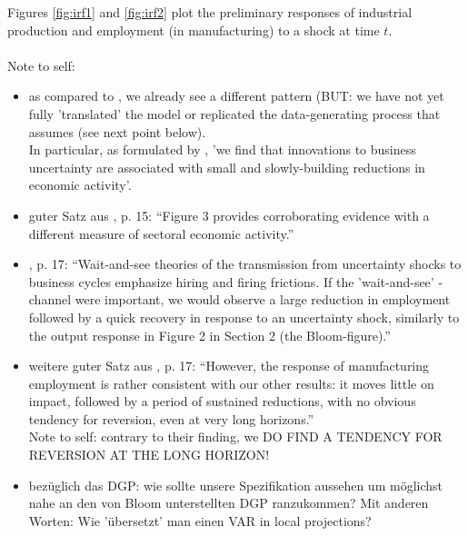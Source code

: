 \documentclass[a4paper,12pt,oneside,pointednumbers,bibtotoc,bigheadings,liststotoc]{scrbook}
\begin{document}
Figures \ref{fig:irf1} and \ref{fig:irf2} plot the preliminary responses of industrial production and employment (in manufacturing) to a shock at time $t$. \\
\\
Note to self:
\begin{itemize}
	\item as compared to \citet{bloom:09}, we already see a different pattern (BUT: we have not yet fully 'translated' the model or replicated the data-generating process that \citet{bloom:09} assumes (see next point below).\\
	In particular, as formulated by \citet{bachmannetal:13}, 'we find that innovations to business uncertainty are associated with small and slowly-building reductions in economic activity'. 
	\item guter Satz aus \citet{bachmannetal:13}, p. 15: ``Figure 3 provides corroborating evidence with a different measure of sectoral economic activity.'' 
	\item \citet{bachmannetal:13}, p. 17: ``Wait-and-see theories of the transmission from uncertainty shocks to business cycles emphasize hiring and firing frictions. If the 'wait-and-see' - channel were important, we would observe a large reduction in employment followed by a quick recovery in response to an uncertainty shock, similarly to the output response in Figure 2 in Section 2 (the Bloom-figure).''
	\item weitere guter Satz aus \citet{bachmannetal:13}, p. 17: ``However, the response of manufacturing employment is rather consistent with our other results: it moves little on impact, followed by a period of sustained reductions, with no obvious tendency for reversion, even at very long horizons.'' \\
	Note to self: contrary to their finding, we DO FIND A TENDENCY FOR REVERSION AT THE LONG HORIZON!
	\item bezüglich das DGP: wie sollte unsere Spezifikation aussehen um möglichst nahe an den von Bloom unterstellten DGP ranzukommen? Mit anderen Worten: Wie 'übersetzt' man einen VAR in local projections?
\end{itemize}
\end{document}
